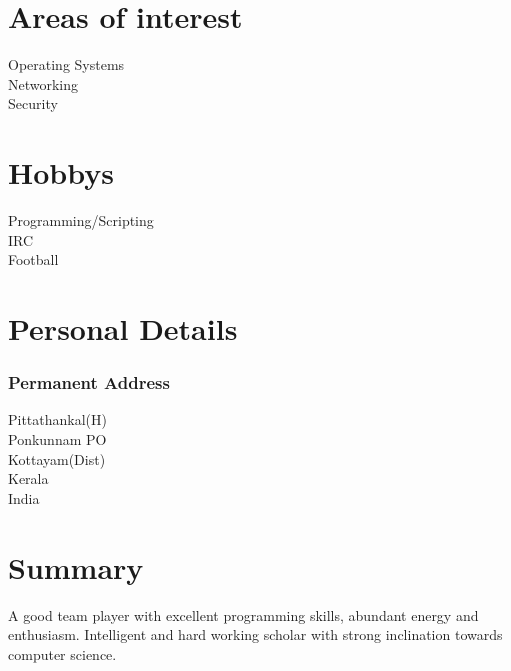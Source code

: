 \documentclass[line,margin]{res}
\begin{document}
\begin{resume}
\section{Areas of interest}
Operating Systems\\
Networking\\
Security\\

\section{Hobbys}
Programming/Scripting\\
IRC\\
Football\\
\section{Personal Details}
\subsubsection{Permanent Address}
Pittathankal(H)\\
Ponkunnam PO\\
Kottayam(Dist)\\
Kerala\\
India\\

\section{Summary}
A good team player with excellent programming skills, abundant energy and enthusiasm. Intelligent and hard working scholar with strong inclination towards computer science.

\end{resume}
\end{document}
